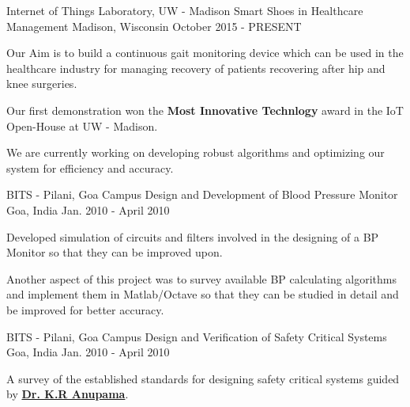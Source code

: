 \begin{cventries}
  \cventry
    {Internet of Things Laboratory, UW - Madison}
    {Smart Shoes in Healthcare Management}
    {Madison, Wisconsin}
    {October 2015 - PRESENT}
    {
      \begin{cvitems}
      \item{Our Aim is to build a continuous gait monitoring device which can be used in the healthcare
          industry for managing recovery of patients recovering after hip and knee surgeries.} 
      \item{Our first demonstration won the \textbf{Most Innovative Technlogy} award in the IoT Open-House at UW - Madison.}
      \item{We are currently working on developing robust algorithms and optimizing our system for efficiency and accuracy.}
      \end{cvitems}
    }
  \cventry
    {BITS - Pilani, Goa Campus}
    {Design and Development of Blood Pressure Monitor}
    {Goa, India}
    {Jan. 2010 - April 2010}
    {
      \begin{cvitems}
        \item{Developed simulation of circuits and filters involved in the designing of a BP Monitor so that they can be improved upon.}
        \item{Another aspect of this project was to survey available BP calculating algorithms and implement them in Matlab/Octave so that 
              they can be studied in detail and be improved for better accuracy.}
      \end{cvitems}
    }
  \cventry
    {BITS - Pilani, Goa Campus}
    {Design and Verification of Safety Critical Systems}
    {Goa, India}
    {Jan. 2010 - April 2010}
    {
      \begin{cvitems}
      \item{A survey of the established standards for designing safety critical systems guided by 
            \textbf{\href{http://universe.bits-pilani.ac.in/goa/anupkr/profile}{Dr. K.R Anupama}}.}
      \end{cvitems}
    }
\end{cventries}
